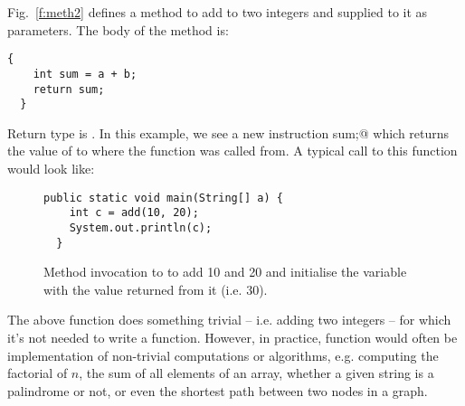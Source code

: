 \documentclass[12pt,a4paper]{article}
\begin{document}
Fig.~\ref{f:meth2} defines a method \lstinline@add@ to add to two integers \lstinline@a@ and \lstinline@b@ supplied to it as parameters. The body of the method is:
\begin{lstlisting}[frame=single]
  {
    int sum = a + b;
    return sum;
  }
\end{lstlisting}
Return type is \lstinline@int@. In this example, we see a new instruction \lstinline@return sum;@ which returns the value of \lstinline@sum@ to where the function was called from. A typical call to this function would look like:
\begin{figure}[H]
\begin{lstlisting}[frame=single]
  public static void main(String[] a) {
    int c = add(10, 20);
    System.out.println(c);
  }
\end{lstlisting}
\caption{Method invocation to \lstinline@add@ to add 10 and 20 and initialise the variable \lstinline@c@ with the value returned from it (i.e. 30).}
\label{f:methcall2}
\end{figure}
The above function \lstinline@add@ does something trivial -- i.e. adding two integers -- for which it's not needed to write a function. However, in practice, function would often be implementation of non-trivial computations or algorithms, e.g. computing the factorial of $n$, the sum of all elements of an array, whether a given string is a palindrome or not, or even the shortest path between two nodes in a graph.
\end{document}
